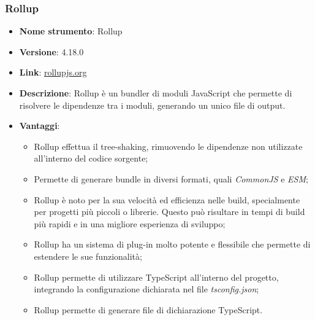 \subsubsection{Rollup}
\begin{itemize}
      \item \textbf{Nome strumento}: Rollup
      \item \textbf{Versione}: 4.18.0
      \item \textbf{Link}: \href{https://rollupjs.org/}{rollupjs.org}
      \item \textbf{Descrizione}: Rollup è un bundler di moduli JavaScript che permette di risolvere le dipendenze tra i moduli, generando un unico file di output.
      \item \textbf{Vantaggi}:
            \begin{itemize}
                  \item Rollup effettua il tree-shaking, rimuovendo le dipendenze non utilizzate all'interno del codice sorgente;
                  \item Permette di generare bundle in diversi formati, quali \textit{CommonJS} e \textit{ESM};
                  \item Rollup è noto per la sua velocità ed efficienza nelle build, specialmente per progetti più piccoli o librerie.
                        Questo può risultare in tempi di build più rapidi e in una migliore esperienza di sviluppo;
                  \item Rollup ha un sistema di plug-in molto potente e flessibile che permette di estendere le sue funzionalità;
                  \item Rollup permette di utilizzare TypeScript all'interno del progetto, integrando la configurazione dichiarata nel file \textit{tsconfig.json};
                  \item Rollup permette di generare file di dichiarazione TypeScript.
            \end{itemize}
\end{itemize}


